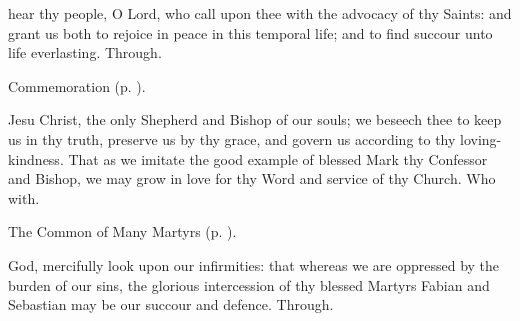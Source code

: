 
\memorialCollect
{} hear thy people, O Lord, who call upon thee with the advocacy of thy Saints: and grant us both to rejoice in peace in this temporal life; and to find succour unto life everlasting. Through.

\begin{rubric}
    Commemoration  (p. \pageref{EphesianCollect}).
\end{rubric}



%
%
%
\memorialCollect\label{EphesianCollect}
 Jesu Christ, the only Shepherd and Bishop of our souls; we beseech thee to keep us in thy truth, preserve us by thy grace, and govern us according to thy loving-kindness. That as we imitate the good example of blessed Mark thy Confessor and Bishop, we may grow in love for thy Word and service of thy Church. Who with.


\clearpage
{}

\begin{rubric}
	The Common of Many Martyrs (p. \pageref{CommonMartyrs}).
\end{rubric}

{} God, mercifully look upon our infirmities: that whereas we are oppressed by the burden of our sins, the glorious intercession of thy blessed Martyrs Fabian and Sebastian may be our succour and defence. Through.



